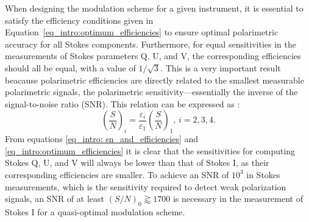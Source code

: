 When designing the modulation scheme for a given instrument, it is essential to satisfy the efficiency conditions given in Equation~\eqref{eq_intro:optimum_efficiencies} to ensure optimal polarimetric accuracy for all Stokes components. Furthermore, for equal sensitivities in the measurements of Stokes parameters Q, U, and V, the corresponding efficiencies should all be equal, with a value of $1/\sqrt{3}$. This is a very important result beacause polarimetric efficiencies are directly related to the smallest measurable polarimetric signals, the polarimetric sensitivity—essentially the inverse of the signal-to-noise ratio (SNR). This relation can be expressed as \citep{optimum_modulation}:
\begin{equation}
  \left( \frac{S}{N}\right)_i = \frac{\varepsilon _ i}{\varepsilon _ 1} \left(\frac{S}{N}\right)_1 \text{,    } i = 2, 3, 4 .
  \label{eq_intro: sn_and_efficiencies}
\end{equation}
From equations \eqref{eq_intro: sn_and_efficiencies} and \eqref{eq_intro:optimum_efficiencies} it is clear that the sensitivities for computing Stokes Q, U, and V will always be lower than that of Stokes I, as their corresponding efficiencies are smaller. To achieve an SNR of $10^3$ in Stokes measurements, which is the sensitivity required to detect weak polarization signals, an SNR of at least $ \left(S/N \right)_0 \gtrapprox 1700$ is necessary in the measurement of Stokes I for a quasi-optimal modulation scheme.

